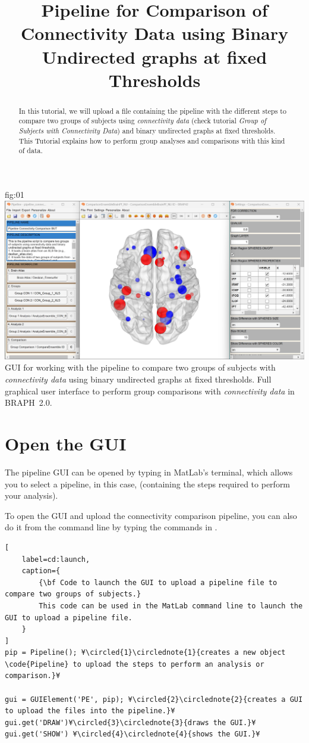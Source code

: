 \documentclass[justified]{tufte-handout}
\title{Pipeline for Comparison of Connectivity Data using Binary Undirected graphs at fixed Thresholds}
\begin{document}
\maketitle

\begin{abstract}
\noindent
In this tutorial, we will upload a file containing the pipeline with the different steps to compare two groups of subjects using \emph{connectivity data} (check tutorial \emph{Group of Subjects with Connectivity Data}) and binary undirected graphs at fixed thresholds. This Tutorial explains how to perform group analyses and comparisons with this kind of data.
\end{abstract}

\tableofcontents

	{fig:01}
	{\includegraphics{fig01.jpg}}
	{GUI for working with the pipeline to compare two groups of subjects with \emph{connectivity data} using binary undirected graphs at fixed thresholds.}
	{
	Full graphical user interface to perform group comparisons with \emph{connectivity data} in BRAPH~2.0. 
	}

\clearpage
\section{Open the GUI}

The pipeline GUI can be opened by typing  in MatLab's terminal, which allows you to select a pipeline, in this case,  (containing the steps required to perform your analysis).

To open the GUI and upload the connectivity comparison pipeline, you can also do it from the command line by typing the commands in .
%
\begin{lstlisting}[
	label=cd:launch,
	caption={
		{\bf Code to launch the GUI to upload a pipeline file to compare two groups of subjects.}
		This code can be used in the MatLab command line to launch the GUI to upload a pipeline file.
	}
]
pip = Pipeline(); ¥\circled{1}\circlednote{1}{creates a new object \code{Pipeline} to upload the steps to perform an analysis or comparison.}¥

gui = GUIElement('PE', pip); ¥\circled{2}\circlednote{2}{creates a GUI to upload the files into the pipeline.}¥
gui.get('DRAW')¥\circled{3}\circlednote{3}{draws the GUI.}¥
gui.get('SHOW') ¥\circled{4}\circlednote{4}{shows the GUI.}¥
\end{lstlisting}
\end{document}
